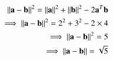 
\begin{equation}
\begin{aligned}
\left\lVert\mathbf{a} - \mathbf{b}\right\rVert^2 = \left\lVert\mathbf{a}\right\rVert^2 + \left\lVert\mathbf{b}\right\rVert^2 - 2\mathbf{a}^T \mathbf{b}\\
\implies \left\lVert\mathbf{a} - \mathbf{b}\right\rVert^2 = 2^2 + 3^2 - 2\times 4\\
\implies \left\lVert\mathbf{a} - \mathbf{b}\right\rVert^2 = 5\\
\implies \left\lVert\mathbf{a} - \mathbf{b}\right\rVert = \sqrt{5}\\
\end{aligned}
\end{equation}
